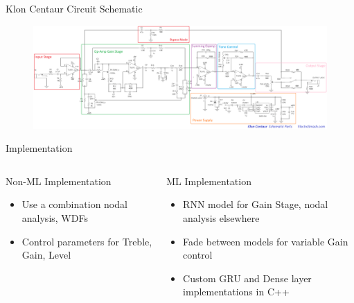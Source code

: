 \begin{frame}
\end{frame}

\begin{frame}{Klon Centaur Circuit Schematic}
    \begin{figure}
        \centering
        \includegraphics[width=5.75in]{../Paper/Figures/FullCircuit.png}
    \end{figure}
\end{frame}

\begin{frame}{Implementation}
    \begin{columns}
        \begin{column}{0.45\linewidth}
            Non-ML Implementation
            \begin{itemize}
                \item Use a combination nodal analysis, WDFs
                \item Control parameters for Treble, Gain, Level
            \end{itemize}
        \end{column}
        \begin{column}{0.55\linewidth}
            ML Implementation
            \begin{itemize}
                \item RNN model for Gain Stage, nodal analysis elsewhere
                \item Fade between models for variable Gain control
                \item Custom GRU and Dense layer implementations in C++
            \end{itemize}
        \end{column}
    \end{columns}
\end{frame}

